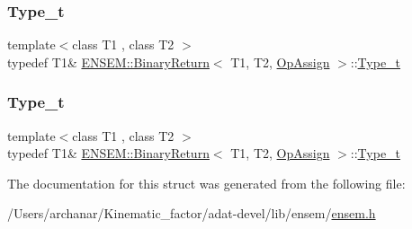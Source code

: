 \mbox{\label{structENSEM_1_1BinaryReturn_3_01T1_00_01T2_00_01OpAssign_01_4_a190b733bfdae86d7ca324cd9290b4100}} 
\subsubsection{\texorpdfstring{Type\_t}{Type\_t}\hspace{0.1cm}{\footnotesize\ttfamily [2/3]}}
{\footnotesize\ttfamily template$<$class T1 , class T2 $>$ \\
typedef T1\& \mbox{\hyperlink{structENSEM_1_1BinaryReturn}{E\+N\+S\+E\+M\+::\+Binary\+Return}}$<$ T1, T2, \mbox{\hyperlink{structENSEM_1_1OpAssign}{Op\+Assign}} $>$\+::\mbox{\hyperlink{structENSEM_1_1BinaryReturn_3_01T1_00_01T2_00_01OpAssign_01_4_a190b733bfdae86d7ca324cd9290b4100}{Type\+\_\+t}}}

\mbox{\label{structENSEM_1_1BinaryReturn_3_01T1_00_01T2_00_01OpAssign_01_4_a190b733bfdae86d7ca324cd9290b4100}} 
\subsubsection{\texorpdfstring{Type\_t}{Type\_t}\hspace{0.1cm}{\footnotesize\ttfamily [3/3]}}
{\footnotesize\ttfamily template$<$class T1 , class T2 $>$ \\
typedef T1\& \mbox{\hyperlink{structENSEM_1_1BinaryReturn}{E\+N\+S\+E\+M\+::\+Binary\+Return}}$<$ T1, T2, \mbox{\hyperlink{structENSEM_1_1OpAssign}{Op\+Assign}} $>$\+::\mbox{\hyperlink{structENSEM_1_1BinaryReturn_3_01T1_00_01T2_00_01OpAssign_01_4_a190b733bfdae86d7ca324cd9290b4100}{Type\+\_\+t}}}



The documentation for this struct was generated from the following file\+:\begin{DoxyCompactItemize}
\item 
/\+Users/archanar/\+Kinematic\+\_\+factor/adat-\/devel/lib/ensem/\mbox{\hyperlink{adat-devel_2lib_2ensem_2ensem_8h}{ensem.\+h}}\end{DoxyCompactItemize}
